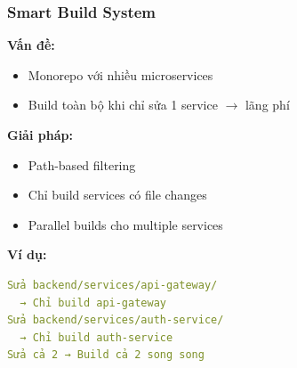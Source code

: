 \documentclass[aspectratio=169]{beamer}
\begin{document}
\begin{frame}
\frametitle{Smart Build System}
\textbf{Vấn đề:}
\begin{itemize}
    \item Monorepo với nhiều microservices
    \item Build toàn bộ khi chỉ sửa 1 service $\rightarrow$ lãng phí
\end{itemize}

\vspace{0.3cm}
\textbf{Giải pháp:}
\begin{itemize}
    \item Path-based filtering
    \item Chỉ build services có file changes
    \item Parallel builds cho multiple services
\end{itemize}

\vspace{0.3cm}
\textbf{Ví dụ:}
\begin{lstlisting}[language=yaml, basicstyle=\tiny]
Sửa backend/services/api-gateway/ 
  → Chỉ build api-gateway
Sửa backend/services/auth-service/ 
  → Chỉ build auth-service
Sửa cả 2 → Build cả 2 song song
\end{lstlisting}
\end{frame}
\end{document}
